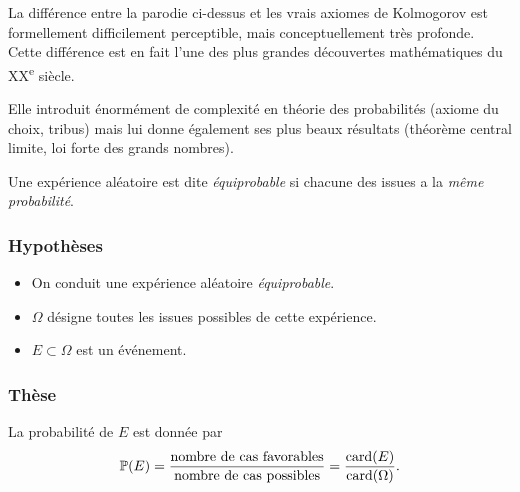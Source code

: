 \documentclass[main.tex]{subfiles}
\begin{document}
\begin{remark}

    La différence entre la parodie ci-dessus et les vrais axiomes de Kolmogorov est formellement difficilement perceptible,
    mais conceptuellement très profonde.
    Cette différence est en fait l'une des plus grandes découvertes mathématiques du XX\textsuperscript{e} siècle.

    Elle introduit énormément de complexité en théorie des probabilités
    (axiome du choix, tribus)
    mais lui donne également ses plus beaux résultats
    (théorème central limite, loi forte des grands nombres).
\end{remark}

\begin{definition}
    [Équiprobabilité]

    Une expérience aléatoire est dite \emph{équiprobable}
    si chacune des issues a la \emph{même probabilité}.
\end{definition}

\begin{proposition}

    \subsubsection{Hypothèses}
    \begin{itemize}
        \item On conduit une expérience aléatoire \emph{équiprobable}.
        \item $\Omega$ désigne toutes les issues possibles de cette expérience.
        \item $E \subset \Omega$ est un événement.
    \end{itemize}

    \subsubsection{Thèse}
    La probabilité de $E$ est donnée par
    \begin{align}
        \mathbb{P}(E) = \frac {\text{nombre de cas favorables}} {\text{nombre de cas possibles}}
        = \frac {\operatorname{card}(E)} {\operatorname{card}(\Omega)}.
    \end{align}
\end{proposition}
\end{document}

